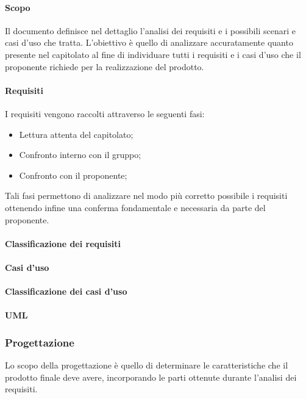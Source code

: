 \paragraph{Scopo}
Il documento \docNameAdR{} definisce nel dettaglio l'analisi dei requisiti e i possibili scenari e casi d'uso che tratta. L'obiettivo è quello di analizzare accuratamente quanto presente nel capitolato al fine di individuare tutti i requisiti e i casi d'uso che il proponente richiede per la realizzazione del prodotto.

\paragraph{Requisiti}
I requisiti vengono raccolti attraverso le seguenti fasi:
\begin{itemize}
\item Lettura attenta del capitolato;
\item Confronto interno con il gruppo;
\item Confronto con il proponente;
\end{itemize}
Tali fasi permettono di analizzare nel modo più corretto possibile i requisiti ottenendo infine una conferma fondamentale e necessaria da parte del proponente.

\paragraph{Classificazione dei requisiti}


\paragraph{Casi d'uso}


\paragraph{Classificazione dei casi d'uso}


\paragraph{UML}


\subsubsection{Progettazione}
Lo scopo della progettazione è quello di determinare le caratteristiche che il prodotto finale deve avere, incorporando le parti ottenute durante l'analisi dei requisiti.

